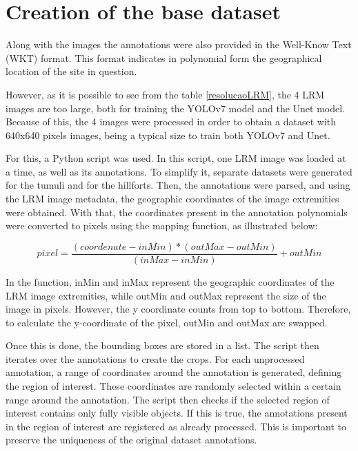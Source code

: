 \section{Creation of the base dataset}

Along with the images the annotations were also provided in the Well-Know Text (WKT) format. This format indicates in polynomial form the geographical location of the site in question.

However, as it is possible to see from the table \ref{resolucaoLRM}, the 4 LRM images are too large, both for training the YOLOv7 model and the Unet model. Because of this, the 4 images were processed in order to obtain a dataset with 640x640 pixels images, being a typical size to train both YOLOv7 and Unet.

For this, a Python script was used. In this script, one LRM image was loaded at a time, as well as its annotations. To simplify it, separate datasets were generated for the tumuli and for the hillforts. Then, the annotations were parsed, and using the LRM image metadata, the geographic coordinates of the image extremities were obtained. With that, the coordinates present in the annotation polynomials were converted to pixels using the mapping function, as illustrated below:

\begin{equation}
     pixel = \frac{(coordenate - inMin) * (outMax - outMin)} {(inMax - inMin)} + outMin
     \label{Map function}
\end{equation}

In the function, inMin and inMax represent the geographic coordinates of the LRM image extremities, while outMin and outMax represent the size of the image in pixels. However, the y coordinate counts from top to bottom. Therefore, to calculate the y-coordinate of the pixel, outMin and outMax are swapped.

Once this is done, the bounding boxes are stored in a list. The script then iterates over the annotations to create the crops. For each unprocessed annotation, a range of coordinates around the annotation is generated, defining the region of interest. These coordinates are randomly selected within a certain range around the annotation. The script then checks if the selected region of interest contains only fully visible objects. If this is true, the annotations present in the region of interest are registered as already processed. This is important to preserve the uniqueness of the original dataset annotations. 

